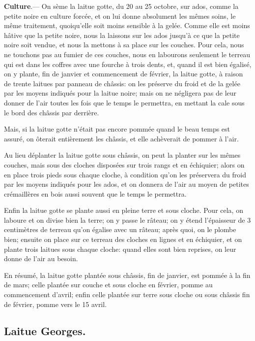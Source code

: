 \documentclass[10pt,a4paper]{book}
\begin{document}
\textbf{Culture}.--- On sème la laitue gotte, du 20 au 25 octobre, sur ados, comme la petite noire en culture forcée, et on lui donne absolument les mêmes soins, le même traitement, quoiqu'elle soit moins sensible à la gelée. Comme elle est moins hâtive que la petite noire, nous la laissons sur les ados jusqu'à ce que la petite noire soit vendue, et nous la mettons à sa place sur les couches. Pour cela, nous ne touchons pas au fumier de ces couches, nous en labourons seulement le terreau qui est dans les coffres avec une fourche à trois dents, et, quand il est bien égalisé, on y plante, fin de janvier et commencement de février, la laitue gotte, à raison de trente laitues par panneau de châssis: on les préserve du froid et de la gelée par les moyens indiqués pour la laitue noire; mais on ne négligera pas de leur donner de l'air toutes les fois que le temps le permettra, en mettant la cale sous le bord des châssis par derrière.

Mais, si la laitue gotte n'était pas encore pommée quand le beau temps est assuré, on ôterait entièrement les châssis, et elle achèverait de pommer à l'air.

Au lieu déplanter la laitue gotte sous châssis, on peut la planter sur les mêmes couches, mais sous des cloches disposées sur trois rangs et en échiquier; alors on en place trois pieds sous chaque cloche, à condition qu'on les préservera du froid par les moyens indiqués pour les ados, et on donnera de l'air au moyen de petites crémaillères en bois aussi souvent que le temps le permettra.

Enfin la laitue gotte se plante aussi en pleine terre et sous cloche. Pour cela, on laboure et on divise bien la terre; on y passe le râteau; on y étend l'épaisseur de 3 centimètres de terreau qu'on égalise avec un râteau; après quoi, on le plombe bien; ensuite on place sur ce terreau des cloches en lignes et en échiquier, et on plante trois laitues sous chaque cloche: quand elles sont bien reprises, on leur donne de l'air au besoin.

En résumé, la laitue gotte plantée sous châssis, fin de janvier, est pommée à la fin de mars; celle plantée sur couche et sous cloche en février, pomme au commencement d'avril; enfin celle plantée sur terre sous cloche ou sous châssis fin de février, pomme vers le 15 avril.

\subsection{Laitue Georges.}
\end{document}
